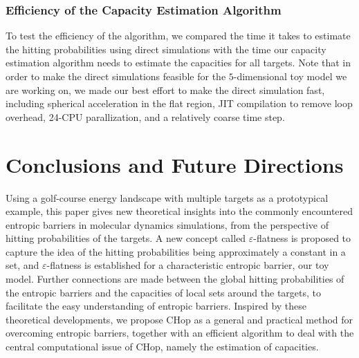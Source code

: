 \documentclass[english, aip, jcp, priprint, graphicx]{revtex4-1}
\theoremstyle{plain}
\theoremstyle{definition}
\theoremstyle{plain}
\begin{document}


\subsubsection{Efficiency of the Capacity Estimation Algorithm}

To test the efficiency of the algorithm, we compared the time it takes to estimate the hitting probabilities using direct simulations with the time our capacity estimation algorithm needs to estimate the capacities for all targets. Note that in order to make the direct simulations feasible for the $5$-dimensional toy model we are working on, we made our best effort to make the direct simulation fast, including spherical acceleration in the flat region, JIT compilation to remove loop overhead, 24-CPU parallization, and a relatively coarse time step.



\section{Conclusions and Future Directions}\label{sec:conclusion}

Using a golf-course energy landscape with multiple targets as a prototypical example, this paper gives new theoretical insights into the commonly encountered entropic barriers in molecular dynamics simulations, from the perspective of hitting probabilities of the targets. A new concept called $\varepsilon$-flatness is proposed to capture the idea of the hitting probabilities being approximately a constant in a set, and $\varepsilon$-flatness is established for a characteristic entropic barrier, our toy model. Further connections are made between the global hitting probabilities of the entropic barriers and the capacities of local sets around the targets, to facilitate the easy understanding of entropic barriers. Inspired by these theoretical developments, we propose CHop as a general and practical method for overcoming entropic barriers, together with an efficient algorithm to deal with the central computational issue of CHop, namely the estimation of capacities.
\end{document}
